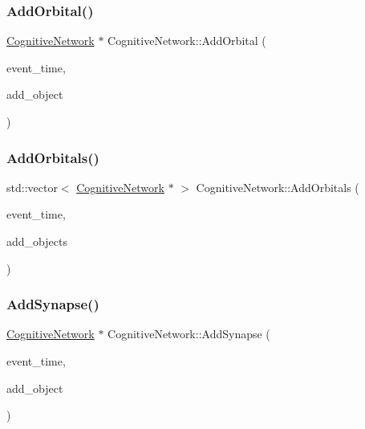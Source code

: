 \subsubsection{\texorpdfstring{Add\+Orbital()}{AddOrbital()}}
{\footnotesize\ttfamily \mbox{\hyperlink{classCognitiveNetwork}{Cognitive\+Network}} $\ast$ Cognitive\+Network\+::\+Add\+Orbital (\begin{DoxyParamCaption}\item[{std\+::chrono\+::time\+\_\+point$<$ \mbox{\hyperlink{universe_8h_a0ef8d951d1ca5ab3cfaf7ab4c7a6fd80}{Clock}} $>$}]{event\+\_\+time,  }\item[{\mbox{\hyperlink{classCognitiveNetwork}{Cognitive\+Network}} $\ast$}]{add\+\_\+object }\end{DoxyParamCaption})}

\mbox{\label{classCognitiveNetwork_a9dbf4a9fab3b806d2bd6b2701b7a9548}} 
\subsubsection{\texorpdfstring{Add\+Orbitals()}{AddOrbitals()}}
{\footnotesize\ttfamily std\+::vector$<$ \mbox{\hyperlink{classCognitiveNetwork}{Cognitive\+Network}} $\ast$ $>$ Cognitive\+Network\+::\+Add\+Orbitals (\begin{DoxyParamCaption}\item[{std\+::chrono\+::time\+\_\+point$<$ \mbox{\hyperlink{universe_8h_a0ef8d951d1ca5ab3cfaf7ab4c7a6fd80}{Clock}} $>$}]{event\+\_\+time,  }\item[{std\+::vector$<$ \mbox{\hyperlink{classCognitiveNetwork}{Cognitive\+Network}} $\ast$$>$}]{add\+\_\+objects }\end{DoxyParamCaption})}

\mbox{\label{classCognitiveNetwork_a4bfdcd2affdfe2adb2da68dba60dff0e}} 
\subsubsection{\texorpdfstring{Add\+Synapse()}{AddSynapse()}}
{\footnotesize\ttfamily \mbox{\hyperlink{classCognitiveNetwork}{Cognitive\+Network}} $\ast$ Cognitive\+Network\+::\+Add\+Synapse (\begin{DoxyParamCaption}\item[{std\+::chrono\+::time\+\_\+point$<$ \mbox{\hyperlink{universe_8h_a0ef8d951d1ca5ab3cfaf7ab4c7a6fd80}{Clock}} $>$}]{event\+\_\+time,  }\item[{\mbox{\hyperlink{classCognitiveNetwork}{Cognitive\+Network}} $\ast$}]{add\+\_\+object }\end{DoxyParamCaption})}

